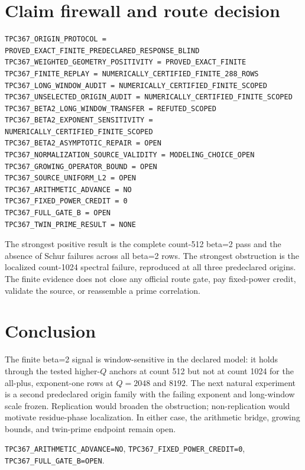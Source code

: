 \documentclass[10pt]{article}
\begin{document}
\section{Claim firewall and route decision}

\begin{verbatim}
TPC367_ORIGIN_PROTOCOL = PROVED_EXACT_FINITE_PREDECLARED_RESPONSE_BLIND
TPC367_WEIGHTED_GEOMETRY_POSITIVITY = PROVED_EXACT_FINITE
TPC367_FINITE_REPLAY = NUMERICALLY_CERTIFIED_FINITE_288_ROWS
TPC367_LONG_WINDOW_AUDIT = NUMERICALLY_CERTIFIED_FINITE_SCOPED
TPC367_UNSELECTED_ORIGIN_AUDIT = NUMERICALLY_CERTIFIED_FINITE_SCOPED
TPC367_BETA2_LONG_WINDOW_TRANSFER = REFUTED_SCOPED
TPC367_BETA2_EXPONENT_SENSITIVITY = NUMERICALLY_CERTIFIED_FINITE_SCOPED
TPC367_BETA2_ASYMPTOTIC_REPAIR = OPEN
TPC367_NORMALIZATION_SOURCE_VALIDITY = MODELING_CHOICE_OPEN
TPC367_GROWING_OPERATOR_BOUND = OPEN
TPC367_SOURCE_UNIFORM_L2 = OPEN
TPC367_ARITHMETIC_ADVANCE = NO
TPC367_FIXED_POWER_CREDIT = 0
TPC367_FULL_GATE_B = OPEN
TPC367_TWIN_PRIME_RESULT = NONE
\end{verbatim}

The strongest positive result is the complete count-512 beta=2 pass and the
absence of Schur failures across all beta=2 rows.  The strongest obstruction
is the localized count-1024 spectral failure, reproduced at all three
predeclared origins.  The finite evidence does not close any official route
gate, pay fixed-power credit, validate the source, or reassemble a prime
correlation.

\section{Conclusion}

The finite beta=2 signal is window-sensitive in the declared model: it holds
through the tested higher-$Q$ anchors at count 512 but not at count 1024 for
the all-plus, exponent-one rows at $Q=2048$ and $8192$.  The next natural
experiment is a second predeclared origin family with the failing exponent and
long-window scale frozen.  Replication would broaden the obstruction;
non-replication would motivate residue-phase localization.  In either case,
the arithmetic bridge, growing bounds, and twin-prime endpoint remain open.

\begin{center}\small
\texttt{TPC367\_ARITHMETIC\_ADVANCE=NO},\quad
\texttt{TPC367\_FIXED\_POWER\_CREDIT=0},\quad
\texttt{TPC367\_FULL\_GATE\_B=OPEN}.
\end{center}
\end{document}
